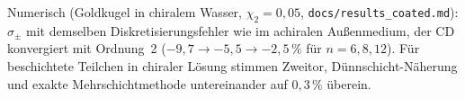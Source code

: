\documentclass[11pt, a4paper]{article}
\theoremstyle{plain}
\theoremstyle{definition}
\begin{document}
Numerisch (Goldkugel in chiralem Wasser, $\chi_2=0{,}05$, \texttt{docs/results\_coated.md}): $\sigma_\pm$ mit demselben
Diskretisierungsfehler wie im achiralen Außenmedium, der CD konvergiert mit Ordnung~2 ($-9{,}7\to-5{,}5\to-2{,}5\,\%$ für
$n=6,8,12$). Für beschichtete Teilchen in chiraler Lösung stimmen Zweitor, Dünnschicht-Näherung und exakte
Mehrschichtmethode untereinander auf $0{,}3\,\%$ überein.
\end{document}
